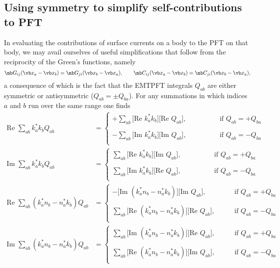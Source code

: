 \subsection{Using symmetry to simplify self-contributions to PFT}

In evaluating the contributions of surface currents on a body to the
PFT on that body, we may avail ourselves of useful simplifications
that follow from the reciprocity of the Green's functions, namely
$$ \mb G_{ij}(\vb x_a - \vb x_b) = \mb G_{ji}(\vb x_b-\vb x_a), 
   \qquad
   \mb C_{ij}(\vb x_a - \vb x_b) = \mb C_{ji}(\vb x_b-\vb x_a),
$$
a consequence of which is the fact that the EMTPFT integrals $Q_{ab}$
are either symmetric or antisymmetric ($Q_{ab}=\pm Q_{ba}$). For any
summations in which indices $a$ and $b$ run over the same range 
one finds
\begin{align*}
   \text{Re }\sum_{ab} k^*_a k_b Q_{ab} 
&=\begin{cases}
   +\sum_{ab} 
    \Big[\text{Re }k_a^* k_b\Big]\Big[\text{Re }Q_{ab}\Big],
    \qquad\qquad &\text{if } Q_{ab} = +Q_{ba} \\
\\
   -\sum_{ab}
    \Big[\text{Im }k_a^* k_b\Big]\Big[\text{Im }Q_{ab}\Big],
    \qquad\qquad &\text{if } Q_{ab} = -Q_{ba} \\
  \end{cases}
\\[10pt]
   \text{Im }\sum_{ab} k^*_a k_b Q_{ab} 
&=\begin{cases}
    \sum_{ab} 
    \Big[\text{Re }k_a^* k_b\Big]\Big[\text{Im }Q_{ab}\Big],
    \qquad\qquad &\text{if } Q_{ab} = +Q_{ba} \\
\\
    \sum_{ab} 
    \Big[\text{Im }k_a^* k_b\Big]\Big[\text{Re }Q_{ab}\Big],
    \quad\qquad &\text{if } Q_{ab} = -Q_{ba} \\
  \end{cases}
\\[10pt]
   \text{Re }\sum_{ab} (k^*_a n_b-n_a^* k_b) Q_{ab}
&=\begin{cases}
   -\Big[\text{Im }(k_a^* n_b - n_a^* k_b)\Big]\Big[\text{Im }Q_{ab}\Big],
    \qquad &\text{if } Q_{ab} = +Q_{ba} \\
\\
    \sum_{ab}
    \Big[\text{Re }(k_a^* n_b - n_a^* k_b)\Big]\Big[\text{Re }Q_{ab}\Big],
    \qquad &\text{if } Q_{ab} = -Q_{ba} \\
  \end{cases}
\\[10pt]
   \text{Im }\sum_{ab} (k^*_a n_b-n_a^* k_b) Q_{ab}
&=\begin{cases}
    \sum_{ab}
    \Big[\text{Im }(k_a^* n_b - n_a^* k_b)\Big]\Big[\text{Re }Q_{ab}\Big],
    \qquad &\text{if } Q_{ab} = +Q_{ba} \\
\\
    \sum_{ab}
    \Big[\text{Re }(k_a^* n_b - n_a^* k_b)\Big]\Big[\text{Im }Q_{ab}\Big],
    \qquad &\text{if } Q_{ab} = -Q_{ba} \\
  \end{cases}
\end{align*}

